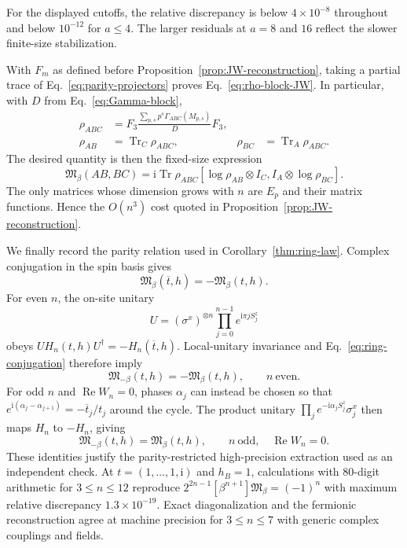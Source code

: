 \documentclass[11pt]{article}
\newcommand{\Tr}{\operatorname{Tr}}
\newcommand{\Mmod}{\mathfrak{M}}
\newcommand{\ii}{\mathrm{i}}
\begin{document}
For the displayed cutoffs, the relative discrepancy is below
$4\times10^{-8}$ throughout and below $10^{-12}$ for $a\le4$.  The larger
residuals at $a=8$ and $16$ reflect the slower finite-size stabilization.

With $F_m$ as defined before Proposition~\ref{prop:JW-reconstruction},
taking a partial trace of Eq.~\eqref{eq:parity-projectors} proves
Eq.~\eqref{eq:rho-block-JW}.  In particular, with
$D$ from Eq.~\eqref{eq:Gamma-block},
\begin{align}
 \rho_{ABC}&=F_3\frac{\sum_{p,s}p^s\Gamma_{ABC}(M_{p,s})}{D}F_3,
 \label{eq:rhoABC-JW}\\
 \rho_{AB}&=\Tr_C\rho_{ABC},
 &\rho_{BC}&=\Tr_A\rho_{ABC}.
 \label{eq:rhoABBC-JW}
\end{align}
The desired quantity is then the fixed-size expression
\begin{equation}
 \Mmod_\beta(AB,BC)=\ii\Tr\rho_{ABC}
 \left[\log\rho_{AB}\otimes I_C,
 I_A\otimes\log\rho_{BC}\right].
 \label{eq:M-JW-closed}
\end{equation}
The only matrices whose dimension grows with $n$ are $E_p$ and their matrix
functions.  Hence the $O(n^3)$ cost quoted in Proposition~\ref{prop:JW-reconstruction}.

We finally record the parity relation used in Corollary~\ref{thm:ring-law}.
Complex conjugation in the spin basis gives
\begin{equation}
 \Mmod_\beta(\overline t,h)=-\Mmod_\beta(t,h).
 \label{eq:ring-conjugation}
\end{equation}
For even $n$, the on-site unitary
\begin{equation}
 U=(\sigma^x)^{\otimes n}\prod_{j=0}^{n-1}e^{\ii\pi jS_j^z}
 \label{eq:even-ring-U}
\end{equation}
obeys $UH_n(t,h)U^\dagger=-H_n(\overline t,h)$.  Local-unitary invariance and
Eq.~\eqref{eq:ring-conjugation} therefore imply
\begin{equation}
 \Mmod_{-\beta}(t,h)=-\Mmod_\beta(t,h),
 \qquad n\ \text{even}.
 \label{eq:even-ring-parity}
\end{equation}
For odd $n$ and $\operatorname{Re}W_n=0$, phases $\alpha_j$ can instead be
chosen so that
$e^{\ii(\alpha_j-\alpha_{j+1})}=-\overline t_j/t_j$ around the cycle.  The
product unitary $\prod_je^{-\ii\alpha_jS_j^z}\sigma_j^x$ then maps $H_n$ to
$-H_n$, giving
\begin{equation}
 \Mmod_{-\beta}(t,h)=\Mmod_\beta(t,h),
 \qquad n\ \text{odd},\quad\operatorname{Re}W_n=0.
 \label{eq:odd-ring-parity}
\end{equation}
These identities justify the parity-restricted high-precision extraction
used as an independent check.  At
$t=(1,\ldots,1,\ii)$ and $h_B=1$, calculations with 80-digit arithmetic for
$3\le n\le12$ reproduce
$2^{2n-1}[\beta^{n+1}]\Mmod_\beta=(-1)^n$ with maximum relative discrepancy
$1.3\times10^{-19}$.  Exact diagonalization and the fermionic reconstruction
agree at machine precision for $3\le n\le7$ with generic complex couplings
and fields.
\end{document}
